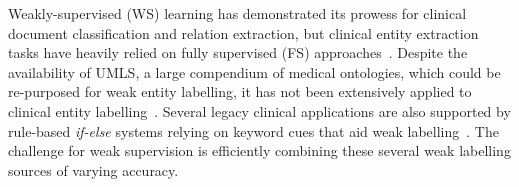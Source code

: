 \documentclass[10.7pt,]{article}
\begin{document}
Weakly-supervised (WS) learning has demonstrated its prowess for clinical document classification and relation extraction, but clinical entity extraction tasks have heavily relied on fully supervised (FS) approaches~\cite{meng2018weakly,mintz2009distant}.
Despite the availability of UMLS, a large compendium of medical ontologies, which could be re-purposed for weak entity labelling, it has not been extensively applied to clinical entity labelling~\cite{humphreys1998unified}.
Several legacy clinical applications are also supported by rule-based \textit{if-else} systems relying on keyword cues that aid weak labelling~\cite{friedlin2008software,kim2017extracting,yang2015automatic}. The challenge for weak supervision is efficiently combining these several weak labelling sources of varying accuracy.
\end{document}
